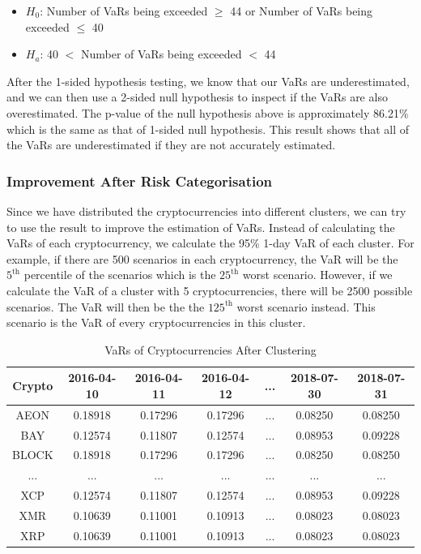 \documentclass[11pt]{article} %
\theoremstyle{plain}
\theoremstyle{definition}
\begin{document}
\begin{itemize}
    \item \textsl{$H_0$}: Number of VaRs being exceeded $\geq$ 44 or Number of VaRs being exceeded $\leq$ 40
    \item \textsl{$H_a$}: 40 $<$ Number of VaRs being exceeded $<$ 44
\end{itemize}

After the 1-sided hypothesis testing, we know that our VaRs are underestimated, and we can then use a 2-sided null hypothesis to inspect if the VaRs are also overestimated. The p-value of the null hypothesis above is approximately 86.21\% which is the same as that of 1-sided null hypothesis. This result shows that all of the VaRs are underestimated if they are not accurately estimated.

\subsubsection{Improvement After Risk Categorisation}

Since we have distributed the cryptocurrencies into different clusters, we can try to use the result to improve the estimation of VaRs. Instead of calculating the VaRs of each cryptocurrency, we calculate the 95\% 1-day VaR of each cluster. For example, if there are 500 scenarios in each cryptocurrency, the VaR will be the $5^{\mathrm{th}}$ percentile of the scenarios which is the $25^{\mathrm{th}}$ worst scenario. However, if we calculate the VaR of a cluster with 5 cryptocurrencies, there will be 2500 possible scenarios. The VaR will then be the the $125^{\mathrm{th}}$ worst scenario instead. This scenario is the VaR of every cryptocurrencies in this cluster.

{
  \begin{table}[ht]
    \centering
    \small
    \begin{tabular}{|c|c c c c c c|}
        \hline
        Crypto & 2016-04-10 & 2016-04-11 & 2016-04-12 & ... & 2018-07-30 & 2018-07-31 \\ [0.5ex]
        \hline
        AEON & 0.18918 & 0.17296 & 0.17296 & ... & 0.08250 & 0.08250 \\
        \hline
        BAY & 0.12574 & 0.11807 & 0.12574 & ... & 0.08953 & 0.09228 \\
        \hline
        BLOCK & 0.18918 & 0.17296 & 0.17296 & ... & 0.08250 & 0.08250 \\
        \hline
        ... & ... & ... & ... & ... & ... & ... \\
        \hline
        XCP & 0.12574 & 0.11807 & 0.12574 & ... & 0.08953 & 0.09228 \\
        \hline
        XMR & 0.10639 & 0.11001 & 0.10913 & ... & 0.08023 & 0.08023 \\
        \hline
        XRP & 0.10639 & 0.11001 & 0.10913 & ... & 0.08023 & 0.08023 \\
        \hline
    \end{tabular}
    \caption{VaRs of Cryptocurrencies After Clustering}
    \label{table:varcryptoafter}
  \end{table}
}
\end{document}
